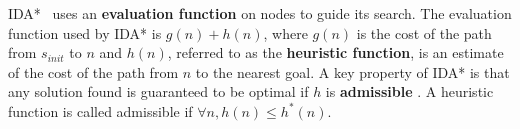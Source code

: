 \documentclass{article}
\begin{document}
IDA*~\cite{korf85} uses an \textbf{evaluation function} on nodes to guide its search. The evaluation function used by IDA* is $g(n) + h(n)$, where $g(n)$ is the cost of the path from $s_{init}$ to $n$ and $h(n)$, referred to as the \textbf{heuristic function}, is an estimate of the cost of the path from $n$ to the nearest goal.
A key property of IDA* is that any solution found is guaranteed to be optimal if $h$ is \textbf{admissible} \cite{korf85}. A heuristic function is called admissible if $\forall n, h(n) \leq h^*(n)$. 










%
\end{document}
